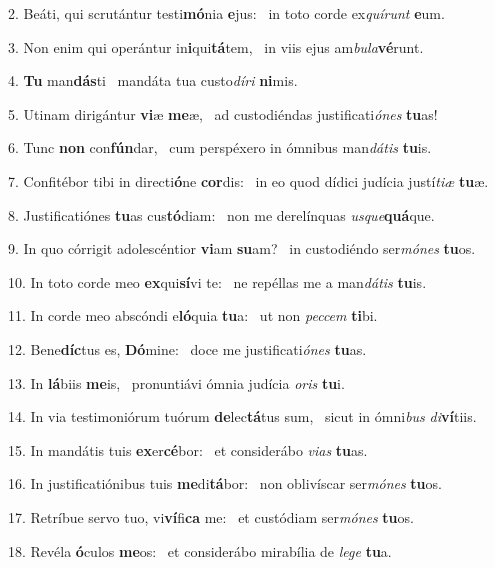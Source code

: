 2. Beáti, qui scrutántur testi\textbf{mó}nia \textbf{e}jus: \ast\  in toto corde ex\textit{quí}\textit{runt} \textbf{e}um.\

3. Non enim qui operántur in\textbf{i}qui\textbf{tá}tem, \ast\  in viis ejus am\textit{bu}\textit{la}\textbf{vé}runt.\

4. \textbf{Tu} man\textbf{dás}ti \ast\  mandáta tua custo\textit{dí}\textit{ri} \textbf{ni}mis.\

5. Utinam dirigántur \textbf{vi}æ \textbf{me}æ, \ast\  ad custodiéndas justificati\textit{ó}\textit{nes} \textbf{tu}as!\

6. Tunc \textbf{non} con\textbf{fún}dar, \ast\  cum perspéxero in ómnibus man\textit{dá}\textit{tis} \textbf{tu}is.\

7. Confitébor tibi in directi\textbf{ó}ne \textbf{cor}dis: \ast\  in eo quod dídici judícia justí\textit{ti}\textit{æ} \textbf{tu}æ.\

8. Justificatiónes \textbf{tu}as cus\textbf{tó}diam: \ast\  non me derelínquas \textit{us}\textit{que}\textbf{quá}que.\

9. In quo córrigit adolescéntior \textbf{vi}am \textbf{su}am? \ast\  in custodiéndo ser\textit{mó}\textit{nes} \textbf{tu}os.\

10. In toto corde meo \textbf{ex}qui\textbf{sí}vi te: \ast\  ne repéllas me a man\textit{dá}\textit{tis} \textbf{tu}is.\

11. In corde meo abscóndi e\textbf{ló}quia \textbf{tu}a: \ast\  ut non \textit{pec}\textit{cem} \textbf{ti}bi.\

12. Bene\textbf{díc}tus es, \textbf{Dó}mine: \ast\  doce me justificati\textit{ó}\textit{nes} \textbf{tu}as.\

13. In \textbf{lá}biis \textbf{me}is, \ast\  pronuntiávi ómnia judícia \textit{o}\textit{ris} \textbf{tu}i.\

14. In via testimoniórum tuórum \textbf{de}lec\textbf{tá}tus sum, \ast\  sicut in ómni\textit{bus} \textit{di}\textbf{ví}tiis.\

15. In mandátis tuis \textbf{ex}er\textbf{cé}bor: \ast\  et considerábo \textit{vi}\textit{as} \textbf{tu}as.\

16. In justificatiónibus tuis \textbf{me}di\textbf{tá}bor: \ast\  non oblivíscar ser\textit{mó}\textit{nes} \textbf{tu}os.\

17. Retríbue servo tuo, vi\textbf{ví}fi\textbf{ca} me: \ast\  et custódiam ser\textit{mó}\textit{nes} \textbf{tu}os.\

18. Revéla \textbf{ó}culos \textbf{me}os: \ast\  et considerábo mirabília de \textit{le}\textit{ge} \textbf{tu}a.\

